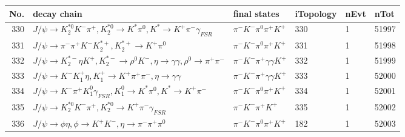 \begin{table}[htbp] 
\begin{center}
\begin{small}
\begin{tabular}{rlllll}\hline\hline
 No. & decay chain & final states &  iTopology & nEvt & nTot \\\hline
330&$J/\psi       \rightarrow K_2^{*0}       K^{-}          \pi^{+}        , K_2^{*0}        \rightarrow K^{*}          \pi^{0}        , K^{*}           \rightarrow K^{+}          \pi^{-}        \gamma_{FSR} $&$\pi^{-}        K^{-}          \pi^{0}        \pi^{+}        K^{+}          $&  330&    1&51997\\
331&$J/\psi       \rightarrow \pi^{-}        \pi^{+}        K^{-}          K_2^{*+}       , K_2^{*+}        \rightarrow K^{+}          \pi^{0}        $&$\pi^{-}        K^{-}          \pi^{0}        \pi^{+}        K^{+}          $&  331&    1&51998\\
332&$J/\psi       \rightarrow K_2^{*-}       \eta          K^{+}          , K_2^{*-}        \rightarrow \rho^{0}      K^{-}          , \eta           \rightarrow \gamma       \gamma       , \rho^{0}       \rightarrow \pi^{+}        \pi^{-}        $&$\pi^{-}        K^{-}          \pi^{+}        \gamma       \gamma       K^{+}          $&  332&    1&51999\\
333&$J/\psi       \rightarrow K^{-}          K_1^{+}        \eta          , K_1^{+}         \rightarrow K^{+}          \pi^{+}        \pi^{-}        , \eta           \rightarrow \gamma       \gamma       $&$\pi^{-}        K^{-}          \pi^{+}        \gamma       \gamma       K^{+}          $&  333&    1&52000\\
334&$J/\psi       \rightarrow K^{-}          \pi^{+}        K_1^{0}        \gamma_{FSR} , K_1^{0}         \rightarrow K^{*}          \pi^{0}        , K^{*}           \rightarrow K^{+}          \pi^{-}        $&$\pi^{-}        K^{-}          \pi^{0}        \pi^{+}        K^{+}          $&  334&    1&52001\\
335&$J/\psi       \rightarrow K_2^{*0}       K^{-}          \pi^{+}        , K_2^{*0}        \rightarrow K^{+}          \pi^{-}        \gamma_{FSR} $&$\pi^{-}        K^{-}          \pi^{+}        K^{+}          $&  335&    1&52002\\
336&$J/\psi       \rightarrow \phi           \eta          , \phi            \rightarrow K^{+}          K^{-}          , \eta           \rightarrow \pi^{-}        \pi^{+}        \pi^{0}        $&$\pi^{-}        K^{-}          \pi^{0}        \pi^{+}        K^{+}          $&  182&    1&52003\\

\end{tabular}
\end{small}
\end{center}
\end{table}
